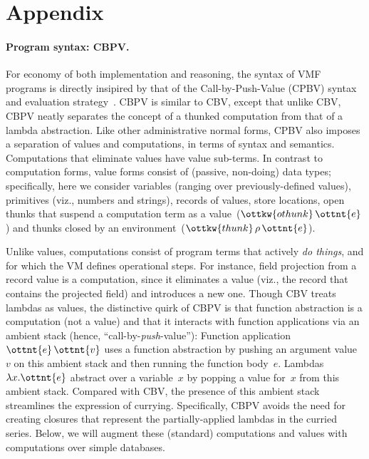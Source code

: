 \clearpage
\appendix
\section{Appendix}


\paragraph{Program syntax: CBPV.}
For economy of both implementation and reasoning, the syntax of VMF
programs is directly insipired by that of the Call-by-Push-Value
(CPBV) syntax and evaluation strategy~\cite{CBPV}.
%
CBPV is similar to CBV, except that unlike CBV, CBPV neatly separates
the concept of a thunked computation from that of a lambda
abstraction.
%
Like other administrative normal forms, CPBV also imposes a separation
of values and computations, in terms of syntax and semantics.
%
Computations that eliminate values have value sub-terms.
%
In contrast to computation forms, value forms consist of (passive,
non-doing) data types; specifically, here we consider variables
(ranging over previously-defined values), primitives (viz., numbers
and strings), records of values, store locations, open thunks that
suspend a computation term as a value~($\ottkw{othunk} \, \ottnt{e}$) and thunks
closed by an environment~($\ottkw{thunk} \, \rho \, \ottnt{e}$).

Unlike values, computations consist of program terms that actively
\emph{do things}, and for which the VM defines operational steps. For
instance, field projection from a record value is a computation, since
it eliminates a value (viz., the record that contains the projected
field) and introduces a new one.
%
Though CBV treats lambdas as values, the distinctive quirk of CBPV is
that function abstraction is a computation (not a value) and that it
interacts with function applications via an ambient stack (hence,
``call-by-\emph{push}-value''):
%
Function application~$\ottnt{e} \, \ottnt{v}$ uses a function abstraction by pushing
an argument value~$v$ on this ambient stack and then running the
function body~$e$.
%
Lambdas~$ \lambda  x .  \ottnt{e} $ abstract over a variable~$x$ by popping a value
for~$x$ from this ambient stack.
%
Compared with CBV, the presence of this ambient stack streamlines the
expression of currying.
%
Specifically, CBPV avoids the need for creating closures that
represent the partially-applied lambdas in the curried series.
%
Below, we will augment these (standard) computations and values with
computations over simple databases.

